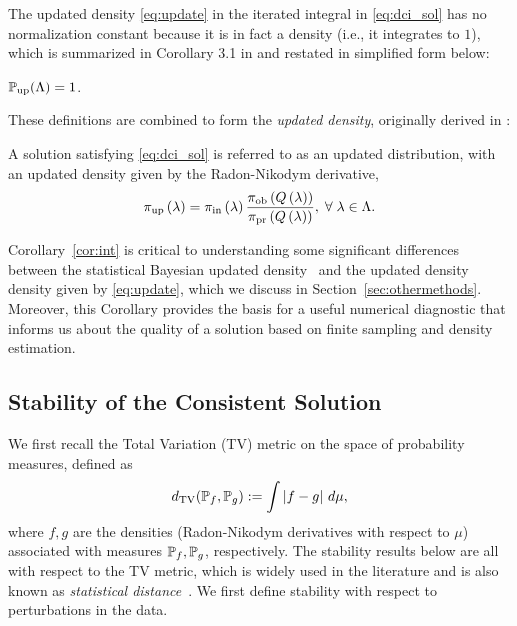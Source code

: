 The updated density \eqref{eq:update} in the iterated integral in \eqref{eq:dci_sol} has no normalization constant because it is in fact a density (i.e., it integrates to $1$), which is summarized in Corollary 3.1 in \cite{BJW18} and restated in simplified form below:
\begin{cor}\label{cor:int}
$\operatorname*{\mathbb{P}_{up}}({\Lambda}) = 1$.
\end{cor}

These definitions are combined to form the \emph{updated density}, originally derived in \cite{BJW18}:

\begin{defn}\label{defn:updated}
  A solution satisfying \eqref{eq:dci_sol} is referred to as an updated distribution, with an updated density given by the Radon-Nikodym derivative,
  \begin{equation}\label{eq:update}
    \operatorname*{\pi_{up}} \left ( \lambda \right ) = \operatorname*{\pi_{in}} \left ( \lambda \right ) \frac{\operatorname*{\pi_{ob}} \left ( Q\left ( \lambda \right ) \right ) }{\operatorname*{\pi_{pr}} \left ( Q\left ( \lambda \right ) \right ) }, \; \forall \; \lambda \in {\Lambda}.
  \end{equation}
\end{defn}

Corollary~\ref{cor:int} is critical to understanding some significant differences between the statistical Bayesian updated density~\cite{Smith} and the updated density density given by \eqref{eq:update}, which we discuss in Section~\ref{sec:othermethods}.
Moreover, this Corollary provides the basis for a useful numerical diagnostic that informs us about the quality of a solution based on finite sampling and density estimation.



\subsection{Stability of the Consistent Solution}\label{sec:stability}

We first recall the Total Variation (TV) metric on the space of probability measures, defined as
\begin{equation}\label{eq:tv}
d_{\text{TV}} (\mathbb{P}_f, \mathbb{P}_g) := \int \left\vert f - g\right\vert \, d\mu,
\end{equation}
where $f,g$ are the densities (Radon-Nikodym derivatives with respect to $\mu$) associated with measures $\mathbb{P}_f, \mathbb{P}_g$, respectively.
The stability results below are all with respect to the TV metric, which is widely used in the literature and is also known as \emph{statistical distance}~\cite{GS02, Smith, Silverman}.
We first define stability with respect to perturbations in the data.

